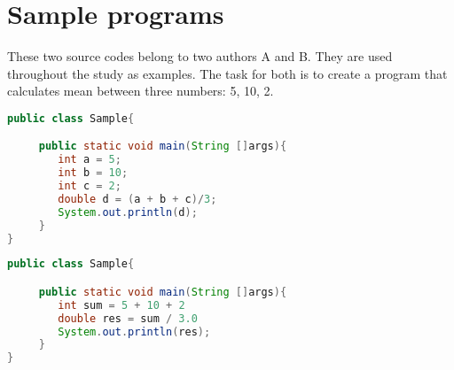 \documentclass[english, grading]{tktltiki2}
\theoremstyle{definition}
\theoremstyle{remark}
\numberwithin{equation}{section} %
\begin{document}
\lstset{style=mystyle}

\section{Sample programs}

These two source codes belong to two authors A and B. They are used throughout the study as examples. The task for both is to create a program that calculates mean between three numbers: 5, 10, 2.

\begin{lstlisting}[language=Java, caption=Java example belonging to author A]
public class Sample{

     public static void main(String []args){
        int a = 5;
        int b = 10;
        int c = 2;
        double d = (a + b + c)/3;
        System.out.println(d);
     }
}
\end{lstlisting}

\begin{lstlisting}[language=Java, caption=Java example belonging to author B]
public class Sample{

     public static void main(String []args){
        int sum = 5 + 10 + 2
        double res = sum / 3.0
        System.out.println(res);
     }
}
\end{lstlisting}
\end{document}
